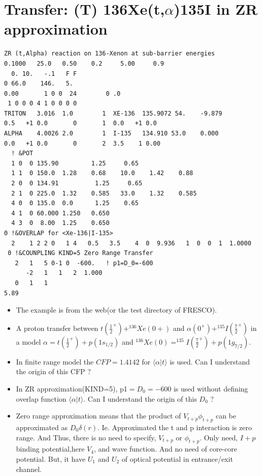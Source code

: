 \documentclass[11pt]{book}
\def\la{\langle}
\def\ra{\rangle}
\begin{document}
\section{Transfer: (T) 136Xe(t,$\alpha$)135I in ZR approximation}
\begin{small} 
\begin{lstlisting}[frame=single]
ZR (t,Alpha) reaction on 136-Xenon at sub-barrier energies
0.1000   25.0   0.50    0.2     5.00     0.9
  0. 10.   -.1   F F
0 66.0    146.   5.
0.00       1 0 0  24        0 .0
 1 0 0 0 4 1 0 0 0 0
TRITON   3.016  1.0        1  XE-136  135.9072 54.    -9.879
0.5   +1 0.0       0       1  0.0   +1 0.0
ALPHA    4.0026 2.0        1  I-135   134.910 53.0    0.000
0.0   +1 0.0       0       2  3.5    1 0.00
  ! &POT
  1 0  0 135.90         1.25     0.65
  1 1  0 150.0  1.28    0.68    10.0    1.42    0.88
  2 0  0 134.91          1.25     0.65
  2 1  0 225.0  1.32    0.585   33.0    1.32    0.585
  4 0  0 135.0  0.0      1.25    0.65
  4 1  0 60.000 1.250   0.650
  4 3  0  8.00  1.25    0.650
0 !&OVERLAP for <Xe-136|I-135>
  2    1 2 2 0   1 4   0.5   3.5    4  0  9.936   1  0  0  1  1.0000
 0 !&COUNPLING KIND=5 Zero Range Transfer
   2   1   5 0-1 0  -600.   ! p1=D_0=-600
      -2   1   1   2  1.000
   0   1   1
5.89
\end{lstlisting}
\end{small} 
\begin{itemize}
\item The example is from the web(or the test directory of FRESCO). 
\item A proton transfer between $t(\frac{1}{2}^+)$+$^{136}Xe(0+)$ and
      $\alpha(0^+)$+$^{135}I(\frac{7}{2}^+)$
      in a model $\alpha=t(\frac{1}{2}^+)+p(1s_{1/2})$ 
      and $^{136}Xe(0)=^{135}I(\frac{7}{2}^+)+p(1g_{7/2})$.      
\item In finite range model the $CFP=1.4142$ for  $\la\alpha|t\ra$ 
      is used.      
      {\color{blue} Can I understand the origin of this CFP ?}
\item In ZR approximation(KIND=5), p1$=D_0=-600$ is used without defining
      overlap function  $\la\alpha|t\ra$.        
      {\color{blue} Can I understand the origin of this $D_0$ ?}
\item Zero range approximation means that the product of $V_{t+p}\phi_{t+p}$
      can be approximated as $D_0\delta(r)$. Ie. Approximated the t and p 
      interaction is zero range. And Thus, there is no need to specify,
      $V_{t+p}$ or $\phi_{t+p}$. Only need, $I+p$ binding potential,here $V_4$, 
      and wave function. And no need of core-core potential. 
      But, it have $U_1$ and $U_2$ of optical potential in entrance/exit channel. 
            
\end{itemize}
\end{document}
